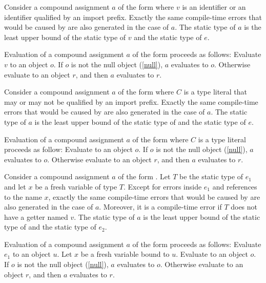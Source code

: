 \documentclass[makeidx]{article}
\begin{document}
{\LMHash{}%
Consider a compound assignment $a$ of the form 
where $v$ is an identifier or an identifier qualified by an import prefix.
Exactly the same compile-time errors that would be caused by
are also generated in the case of $a$.
The static type of $a$ is
the least upper bound of the static type of $v$ and the static type of $e$.

\LMHash{}%
Evaluation of a compound assignment $a$ of the form 
proceeds as follows:
Evaluate $v$ to an object $o$.
If $o$ is not the null object (\ref{null}), $a$ evaluates to $o$.
Otherwise evaluate  to an object $r$,
and then $a$ evaluates to $r$.
\EndCase

\LMHash{}%
Consider a compound assignment $a$ of the form 
where $C$ is a type literal
that may or may not be qualified by an import prefix.
Exactly the same compile-time errors that would be caused by
are also generated in the case of $a$.
The static type of $a$ is the least upper bound of
the static type of  and the static type of $e$.

\LMHash{}%
Evaluation of a compound assignment $a$ of the form 
where $C$ is a type literal proceeds as follow:
Evaluate  to an object $o$.
If $o$ is not the null object (\ref{null}), $a$ evaluates to $o$.
Otherwise evaluate  to an object $r$,
and then $a$ evaluates to $r$.
\EndCase

\LMHash{}%
Consider a compound assignment $a$ of the form .
Let $T$ be the static type of $e_1$ and let $x$ be a fresh variable of type $T$.
Except for errors inside $e_1$ and references to the name $x$,
exactly the same compile-time errors that would be caused by
are also generated in the case of $a$.
Moreover, it is a compile-time error if $T$ does not have a getter named $v$.
The static type of $a$ is the least upper bound of
the static type of  and the static type of $e_2$.

\LMHash{}%
Evaluation of a compound assignment $a$ of the form 
proceeds as follows:
Evaluate $e_1$ to an object $u$.
Let $x$ be a fresh variable bound to $u$.
Evaluate  to an object $o$.
If $o$ is not the null object (\ref{null}), $a$ evaluates to $o$.
Otherwise evaluate  to an object $r$,
and then $a$ evaluates to $r$.
\EndCase

}
\end{document}
